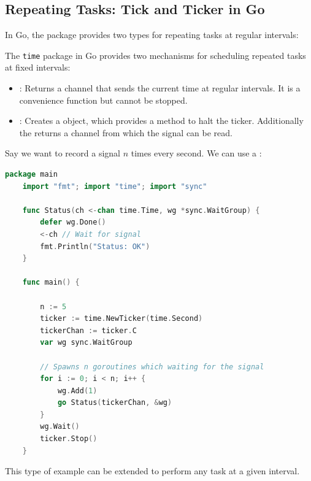 \newpage 
\subsection{Repeating Tasks: Tick and Ticker in Go}

In Go, the  package provides two types for repeating tasks at regular intervals:

\begin{Def}

    The \texttt{time} package in Go provides two mechanisms for scheduling repeated tasks at fixed intervals:
    
    \begin{itemize}
        \item \textbf{}: Returns a channel that sends the current time at regular intervals. It is a convenience function but \textbf{}{cannot be stopped}.
        \item \textbf{}: Creates a  object, which provides a  method to halt the ticker. Additionally the  returns a channel from which the signal can be read.
    \end{itemize}
\end{Def}

\begin{Example}

    Say we want to record a signal $n$ times every second. We can use a :
    \begin{lstlisting}[language=Go, numbers=none]
    package main
    import "fmt"; import "time"; import "sync"
    
    func Status(ch <-chan time.Time, wg *sync.WaitGroup) {
        defer wg.Done()
        <-ch // Wait for signal
        fmt.Println("Status: OK")
    }
    
    func main() {
    
        n := 5
        ticker := time.NewTicker(time.Second)
        tickerChan := ticker.C
        var wg sync.WaitGroup
    
        // Spawns n goroutines which waiting for the signal
        for i := 0; i < n; i++ {
            wg.Add(1)
            go Status(tickerChan, &wg)
        }
        wg.Wait()
        ticker.Stop()
    }
    \end{lstlisting}

    \noindent
    This type of example can be extended to perform any task at a given interval.
\end{Example}
    